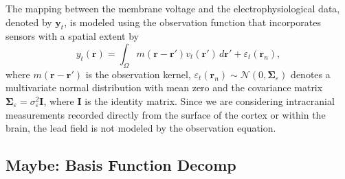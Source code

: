 \documentclass[conference]{IEEEtran}
\begin{document}
The mapping between the membrane voltage and the electrophysiological data, denoted by $\mathbf{y}_t$, is modeled using the observation function that incorporates sensors with a spatial extent by
\begin{equation}\label{eq:ObservationEquation}
	y_t(\mathbf{r}) = \int_{\Omega} { m\left(\mathbf{r}-\mathbf{r}'\right) v_t\left(\mathbf{r}'\right) \, d\mathbf{r}'} + \varepsilon_t(\mathbf{r}_n), 
\end{equation}
where $m\left(\mathbf{r}-\mathbf{r}'\right)$ is the observation kernel, $\varepsilon_t(\mathbf{r}_n) \sim \mathcal{N}\left(0,\boldsymbol{\Sigma}_{\varepsilon}\right)$ denotes a multivariate normal distribution with mean zero and the covariance matrix $\boldsymbol{\Sigma}_{\varepsilon} = \sigma_{\varepsilon}^2\mathbf{I}$, where $\mathbf{I}$ is the identity matrix. Since we are considering intracranial measurements recorded directly from the surface of the cortex or within the brain, the lead field is not modeled by the observation equation.

\subsection{Maybe: Basis Function Decomp}
\end{document}
